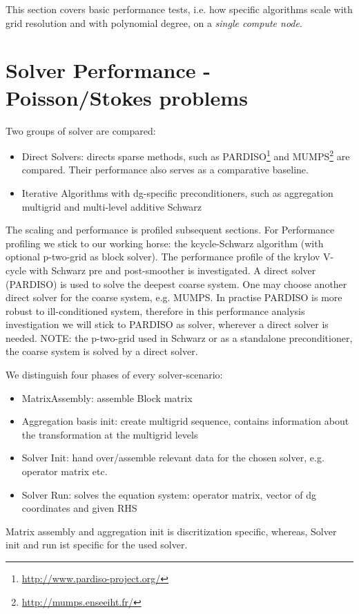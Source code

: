 This section covers basic performance tests, i.e. how specific algorithms scale
with grid resolution and with polynomial degree, on a \emph{single compute node}.

\section{Solver Performance - Poisson/Stokes problems}
\label{sec:SolverPerformancePoisson}
Two groups of solver are compared:
\begin{itemize}
\item
Direct Solvers: directs sparse methods, such as PARDISO\footnote{
\url{http://www.pardiso-project.org/}}
and MUMPS\footnote{
\url{http://mumps.enseeiht.fr/}}
are compared.
Their performance also serves as a comparative baseline.


\item
Iterative Algorithms with \ac{dg}-specific preconditioners, such as aggregation multigrid
and multi-level additive Schwarz
\end{itemize}

The scaling and performance is profiled subsequent sections. For Performance profiling we stick to our working horse: the kcycle-Schwarz algorithm (with optional p-two-grid as block solver).
The performance profile of the krylov V-cycle with Schwarz pre and post-smoother is investigated. A direct solver (PARDISO) is used to solve the deepest coarse system. One may choose another direct solver for the coarse system, e.g. MUMPS. In practise PARDISO is more robust to ill-conditioned system, therefore in this performance analysis investigation we will stick to PARDISO as solver, wherever a direct solver is needed.
NOTE: the p-two-grid used in Schwarz or as a standalone preconditioner, the coarse system is solved by a direct solver.

We distinguish four phases of every solver-scenario: 
\begin{itemize}
	\item MatrixAssembly: assemble Block matrix
	\item Aggregation basis init: create multigrid sequence, contains information about the transformation at the multigrid levels
	\item Solver Init: hand over/assemble relevant data for the chosen solver, e.g. operator matrix etc.
	\item Solver Run: solves the equation system: operator matrix, vector of dg coordinates and given RHS 
\end{itemize}
Matrix assembly and aggregation init is discritization specific, whereas, Solver init and run ist specific for the used solver.

